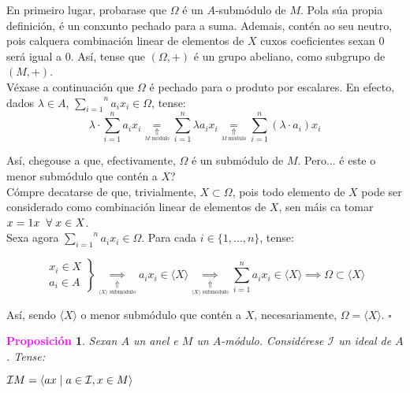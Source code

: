 \documentclass[twoside]{report}
\newcommand{\magbf}[1]{\textcolor{magenta}{\textbf{#1}}} %
\theoremstyle{mystyle}
\newtheorem{prop}{\magbf{Proposición}}[chapter]
\newenvironment{proposition}
{\begin{mdframed}[linecolor = magenta,backgroundcolor = classicrose, linewidth = 2mm]\begin{prop}}
{\end{prop}\end{mdframed}}
\begin{document}
\noindent En primeiro lugar, probarase que $\Omega$ é un $A$-submódulo de $M$. Pola súa propia definición, é un conxunto pechado para a suma. Ademais, contén ao seu neutro, pois calquera combinación linear de elementos de $X$ cuxos coeficientes sexan 0 será igual a 0. Así, tense que $(\Omega, +)$ é un grupo abeliano, como subgrupo de $(M,+)$.\\

\noindent Véxase a continuación que $\Omega$ é pechado para o produto por escalares. En efecto, dados $\lambda \in A$, $\overset{n}{\underset{i = 1}{\sum}}a_{i}x_{i} \in \Omega$, tense:
$$\lambda \cdot \overset{n}{\underset{i = 1}{\sum}}a_{i}x_{i} \underset{\underset{M \text{ módulo}}{\Uparrow}}{=} \overset{n}{\underset{i = 1}{\sum}}\lambda a_{i}x_{i} \underset{\underset{M \text{ módulo}}{\Uparrow}}{=} \overset{n}{\underset{i = 1}{\sum}}(\lambda \cdot a_{i})x_{i}$$

\noindent Así, chegouse a que, efectivamente, $\Omega$ é un submódulo de $M$. Pero... é este o menor submódulo que contén a $X$?\\

\noindent Cómpre decatarse de que, trivialmente, $X \subset \Omega$, pois todo elemento de $X$ pode ser considerado como combinación linear de elementos de $X$, sen máis ca tomar $x = 1x \hspace{2mm} \forall \hspace{1mm} x \in X$.\\

\noindent Sexa agora $\overset{n}{\underset{i = 1}{\sum}}a_{i}x_{i} \in \Omega$. Para cada $i \in \{1, \ldots, n\}$, tense:

    \[ 
    \left. \begin{array}{r} 
    x_{i} \in X \\[1ex]
    a_{i} \in A
    \end{array} \right\} 
    \underset{\underset{\langle X \rangle \text{ submódulo}}{\Uparrow}}{\implies} a_{i}x_{i} \in \langle X \rangle \underset{\underset{\langle X \rangle \text{ submódulo}}{\Uparrow}}{\implies} \sum_{i = 1}^{n}a_{i}x_{i} \in \langle X \rangle \implies \Omega \subset \langle X \rangle
    \]

\noindent Así, sendo $\langle X \rangle$ o menor submódulo que contén a $X$, necesariamente, $\Omega = \langle X \rangle$. $\square$\\

\vspace{3mm}

\begin{proposition} \label{prop3.4}
Sexan $A$ un anel e $M$ un $A$-módulo. Considérese $\mathcal{I}$ un ideal de $A$. Tense:
\begin{center}
 $\mathcal{I}M = \langle ax \hspace{1mm} | \hspace{1mm} a \in \mathcal{I}, x \in M \rangle$   
\end{center}
\end{proposition}
\end{document}
